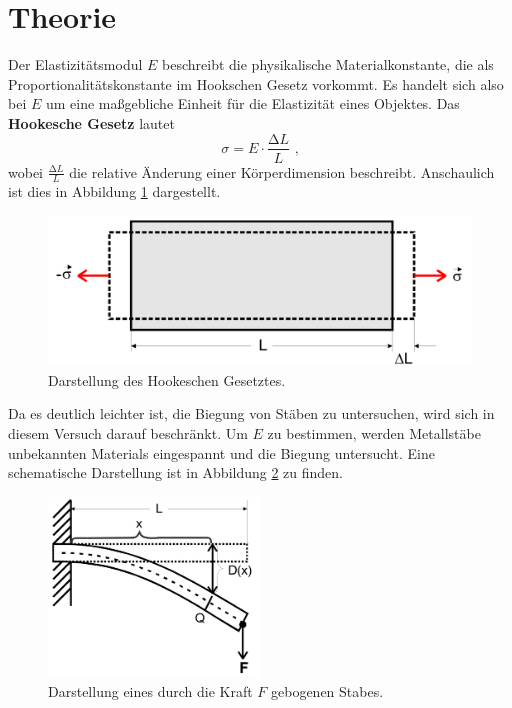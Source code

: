 \section{Theorie}
\label{sec:Theorie}

Der Elastizitätsmodul $E$ beschreibt die physikalische Materialkonstante,
die als Proportionalitätskonstante im Hookschen Gesetz vorkommt.
Es handelt sich also bei $E$ um eine maßgebliche Einheit für die Elastizität eines Objektes.
Das \textbf{Hookesche Gesetz} lautet
\begin{equation}
        \sigma = E \cdot \frac {\increment L}{L} \text{ ,}
\end{equation}
wobei $\frac {\increment L}{L}$ die relative Änderung einer Körperdimension beschreibt.
Anschaulich ist dies in Abbildung \ref{fig:Hook1} dargestellt.

\begin{figure}[H]
        \centering
        \includegraphics[width=\textwidth]{pictures/Hook1.png}
        \caption{Darstellung des Hookeschen Gesetztes.}
        \label{fig:Hook1}
\end{figure}

Da es deutlich leichter ist, die Biegung von Stäben zu untersuchen, wird sich in diesem Versuch darauf beschränkt.
Um $E$ zu bestimmen, werden Metallstäbe unbekannten Materials eingespannt und die Biegung untersucht.
Eine schematische Darstellung ist in Abbildung \ref{fig:Hook2} zu finden.

\begin{figure}[H]
        \centering
        \includegraphics[width=0.5\textwidth]{pictures/Hook2.png}
        \caption{Darstellung eines durch die Kraft $F$ gebogenen Stabes.}
        \label{fig:Hook2}
\end{figure}


